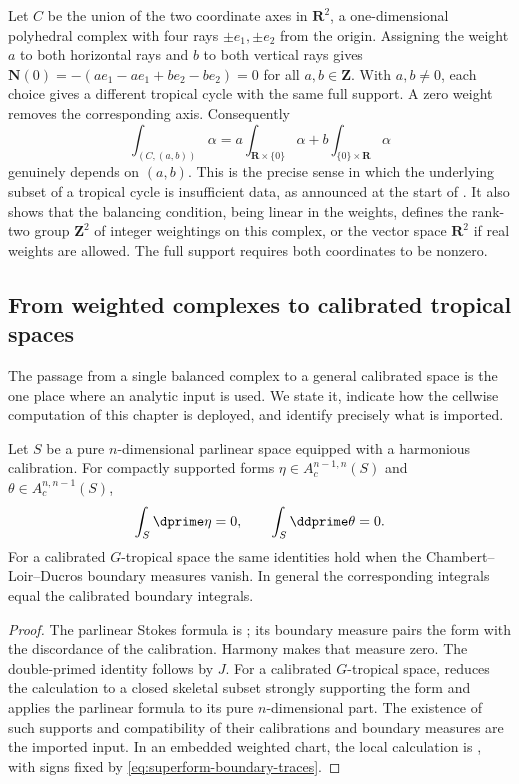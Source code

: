 \begin{example}
\label{ex:ch11-weights-not-support}
Let $C$ be the union of the two coordinate axes in $\mathbf R^2$, a
one-dimensional polyhedral complex with four rays
$\pm e_1,\pm e_2$ from the origin.  Assigning the weight $a$ to both
horizontal rays and $b$ to both vertical rays gives
$\mathbf N(0)=-(a e_1-ae_1+be_2-be_2)=0$ for all $a,b\in\mathbf Z$.
With $a,b\ne0$, each choice gives a different tropical cycle with the
same full support.  A zero weight removes the corresponding axis.  Consequently
\[
 \int_{(C,(a,b))}\alpha
 =a\int_{\mathbf R\times\{0\}}\alpha+b\int_{\{0\}\times\mathbf R}\alpha
\]
genuinely depends on $(a,b)$.  This is the precise sense in which the
underlying subset of a tropical cycle is insufficient data, as announced at
the start of .  It also shows that the balancing
condition, being linear in the weights, defines the rank-two group
$\mathbf Z^2$ of integer weightings on this complex, or the vector space
$\mathbf R^2$ if real weights are allowed.  The full support requires
both coordinates to be nonzero.
\end{example}

\subsection{From weighted complexes to calibrated tropical spaces}
\label{sec:ch11-global-stokes}

The passage from a single balanced complex to a general calibrated space is
the one place where an analytic input is used.  We state it, indicate how
the cellwise computation of this chapter is deployed, and identify precisely
what is imported.

\begin{theorem}\label{thm:cld-global-stokes}
Let $S$ be a pure $n$-dimensional parlinear space equipped with a harmonious
calibration. For compactly
supported forms $\eta\in A^{n-1,n}_c(S)$ and
$\theta\in A^{n,n-1}_c(S)$,
\[
                              \int_S\dprime\eta=0,
                     \qquad   \int_S\ddprime\theta=0.
\]
For a calibrated $G$-tropical space the same identities hold when the
Chambert--Loir--Ducros boundary measures vanish.  In general the
corresponding integrals equal the calibrated boundary integrals.
\end{theorem}

\begin{proof}
The parlinear Stokes formula is
\cite[Proposition~4.6.15(a)]{CLD25}; its boundary measure pairs the form
with the discordance of the calibration.  Harmony makes that measure zero.
The double-primed identity follows by $J$.  For a calibrated $G$-tropical
space, \cite[Proposition~5.11.1(a)]{CLD25} reduces the calculation to a
closed skeletal subset strongly supporting the form and applies the
parlinear formula to its pure $n$-dimensional part.  The existence of such
supports and compatibility of their calibrations and boundary measures
are the imported input.  In an embedded weighted chart, the local
calculation is , with signs fixed by
\eqref{eq:superform-boundary-traces}.
\end{proof}

